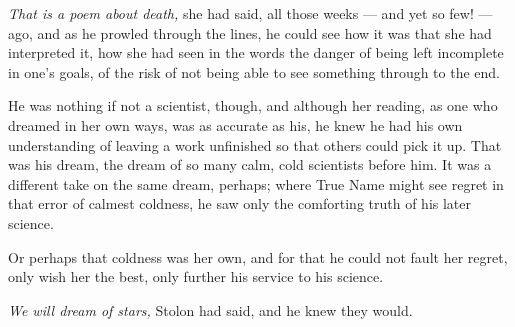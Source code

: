 \emph{That is a poem about death,} she had said, all those weeks — and yet so few! — ago, and as he prowled through the lines, he could see how it was that she had interpreted it, how she had seen in the words the danger of being left incomplete in one's goals, of the risk of not being able to see something through to the end.

He was nothing if not a scientist, though, and although her reading, as one who dreamed in her own ways, was as accurate as his, he knew he had his own understanding of leaving a work unfinished so that others could pick it up. That was his dream, the dream of so many calm, cold scientists before him. It was a different take on the same dream, perhaps; where True Name might see regret in that error of calmest coldness, he saw only the comforting truth of his later science.

Or perhaps that coldness was her own, and for that he could not fault her regret, only wish her the best, only further his service to his science.

\emph{We will dream of stars,} Stolon had said, and he knew they would.
